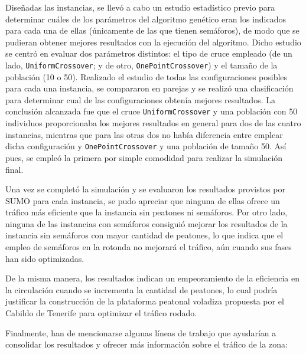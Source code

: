 Diseñadas las instancias, se llevó a cabo un estudio estadístico previo para determinar cuáles de los parámetros del algoritmo genético eran los indicados para cada una de ellas (únicamente de las que tienen semáforos), de modo que se pudieran obtener mejores resultados con la ejecución del algoritmo. Dicho estudio se centró en evaluar dos parámetros distintos: el tipo de cruce empleado (de un lado, \texttt{UniformCrossover}; y de otro, \texttt{OnePointCrossover}) y el tamaño de la población (10 o 50). Realizado el estudio de todas las configuraciones posibles para cada una instancia, se compararon en parejas y se realizó una clasificación para determinar cual de las configuraciones obtenía mejores resultados. La conclusión alcanzada fue que el cruce \texttt{UniformCrossover} y una población con 50 individuos proporcionaba los mejores resultados en general para dos de las cuatro instancias, mientras que para las otras dos no había diferencia entre emplear dicha configuración y \texttt{OnePointCrossover} y una población de tamaño 50. Así pues, se empleó la primera por simple comodidad para realizar la simulación final.

Una vez se completó la simulación y se evaluaron los resultados provistos por SUMO para cada instancia, se pudo apreciar que ninguna de ellas ofrece un tráfico más eficiente que la instancia sin peatones ni semáforos. Por otro lado, ninguna de las instancias con semáforos consiguió mejorar los resultados de la instancia sin semáforos con mayor cantidad de peatones, lo que indica que el empleo de semáforos en la rotonda no mejorará el tráfico, aún cuando sus fases han sido optimizadas. 

De la misma manera, los resultados indican un empeoramiento de la eficiencia en la circulación cuando se incrementa la cantidad de peatones, lo cual podría justificar la construcción de la plataforma peatonal voladiza propuesta por el Cabildo de Tenerife para optimizar el tráfico rodado.

Finalmente, han de mencionarse algunas líneas de trabajo que ayudarían a consolidar los resultados y ofrecer más información sobre el tráfico de la zona:

